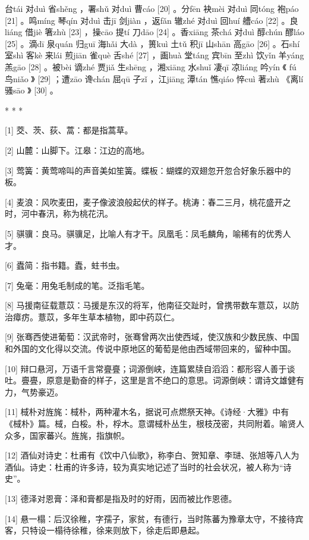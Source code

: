 \documentclass[12pt,UTF8]{ctexbook}
\begin{document}
台tái 对duì 省shěng ，署shǔ 对duì 曹cáo [20] 。分fēn 袂mèi 对duì 同tóng 袍páo [21] 。鸣míng 琴qín 对duì 击jī 剑jiàn ，返fǎn 辙zhé 对duì 回huí 艚cáo [22] 。良liáng 借jiè 箸zhù [23] ，操cāo 提tí 刀dāo [24] 。香xiāng 茶chá 对duì 醇chún 醪láo [25] 。滴dī 泉quán 归guī 海hǎi 大dà ，篑kuì 土tǔ 积jī 山shān 高gāo [26] 。石shí 室shì 客kè 来lái 煎jiān 雀què 舌shé [27] ，画huà 堂táng 宾bīn 至zhì 饮yǐn 羊yáng 羔gāo [28] 。被bèi 谪zhé 贾jiǎ 生shēng ，湘xiāng 水shuǐ 凄qī 凉liáng 吟yín 《 fú 鸟niǎo 》 [29] ；遭zāo 谗chán 屈qū 子zǐ ，江jiāng 潭tán 憔qiáo 悴cuì 著zhù 《离lí 骚sāo 》 [30] 。



* * *



[1] 茭、茨、荻、蒿：都是指蒿草。

[2] 山麓：山脚下。江皋：江边的高地。

[3] 莺簧：黄莺啼叫的声音美如笙簧。蝶板：蝴蝶的双翅忽开忽合好象乐器中的板。

[4] 麦浪：风吹麦田，麦子像波浪般起伏的样子。桃涛：春二三月，桃花盛开之时，河中春汛，称为桃花汛。

[5] 骐骥：良马。骐骥足，比喻人有才干。凤凰毛：凤毛麟角，喻稀有的优秀人才。

[6] 蠹简：指书籍。蠹，蛀书虫。

[7] 兔毫：用兔毛制成的笔。泛指毛笔。

[8] 马援南征载薏苡：马援是东汉的将军，他南征交趾时，曾携带数车薏苡，以防治瘴疠。薏苡，多年生草本植物，即中药苡仁。

[9] 张骞西使进葡萄：汉武帝时，张骞曾两次出使西域，使汉族和少数民族、中国和外国的文化得以交流。传说中原地区的葡萄是他由西域带回来的，留种中国。

[10] 辩口悬河，万语千言常亹亹；词源倒峡，连篇累牍自滔滔：都形容人善于谈吐。亹亹，原意是勤奋的样子，这里是言不绝口的意思。词源倒峡：谓诗文雄健有力，气势豪迈。

[11] 棫朴对旌旄：棫朴，两种灌木名，据说可点燃祭天神。《诗经·大雅》中有《棫朴》篇。棫，白桵。朴，桴木。意谓棫朴丛生，根枝茂密，共同附着。喻贤人众多，国家蕃兴。旌旄，指旗帜。

[12] 酒仙对诗史：杜甫有《饮中八仙歌》，称李白、贺知章、李琎、张旭等八人为酒仙。诗史：杜甫的许多诗，较为真实地记述了当时的社会状况，被人称为“诗史”。

[13] 德泽对恩膏：泽和膏都是指及时的好雨，因而被比作恩德。

[14] 悬一榻：后汉徐稚，字孺子，家贫，有德行，当时陈蕃为豫章太守，不接待宾客，只特设一榻待徐稚，徐来则放下，徐走后即悬起。
\end{document}
